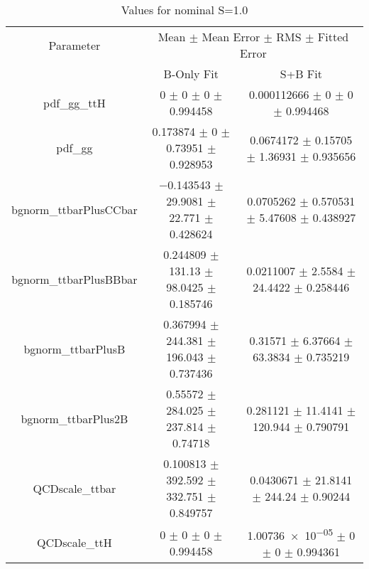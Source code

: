 \begin{table}
\centering
\caption{Values for nominal S=1.0}
\begin{tabular}{ccc}
\toprule
Parameter & \multicolumn{2}{c}{Mean $\pm$ Mean Error $\pm$ RMS $\pm$ Fitted Error}\\
 & B-Only Fit & S+B Fit\\
\midrule
pdf\_gg\_ttH & \num{0} $\pm$ \num{0} $\pm$ \num{0} $\pm$ \num{0.994458} & \num{0.000112666} $\pm$ \num{0} $\pm$ \num{0} $\pm$ \num{0.994468}\\
pdf\_gg & \num{0.173874} $\pm$ \num{0} $\pm$ \num{0.73951} $\pm$ \num{0.928953} & \num{0.0674172} $\pm$ \num{0.15705} $\pm$ \num{1.36931} $\pm$ \num{0.935656}\\
bgnorm\_ttbarPlusCCbar & \num{-0.143543} $\pm$ \num{29.9081} $\pm$ \num{22.771} $\pm$ \num{0.428624} & \num{0.0705262} $\pm$ \num{0.570531} $\pm$ \num{5.47608} $\pm$ \num{0.438927}\\
bgnorm\_ttbarPlusBBbar & \num{0.244809} $\pm$ \num{131.13} $\pm$ \num{98.0425} $\pm$ \num{0.185746} & \num{0.0211007} $\pm$ \num{2.5584} $\pm$ \num{24.4422} $\pm$ \num{0.258446}\\
bgnorm\_ttbarPlusB & \num{0.367994} $\pm$ \num{244.381} $\pm$ \num{196.043} $\pm$ \num{0.737436} & \num{0.31571} $\pm$ \num{6.37664} $\pm$ \num{63.3834} $\pm$ \num{0.735219}\\
bgnorm\_ttbarPlus2B & \num{0.55572} $\pm$ \num{284.025} $\pm$ \num{237.814} $\pm$ \num{0.74718} & \num{0.281121} $\pm$ \num{11.4141} $\pm$ \num{120.944} $\pm$ \num{0.790791}\\
QCDscale\_ttbar & \num{0.100813} $\pm$ \num{392.592} $\pm$ \num{332.751} $\pm$ \num{0.849757} & \num{0.0430671} $\pm$ \num{21.8141} $\pm$ \num{244.24} $\pm$ \num{0.90244}\\
QCDscale\_ttH & \num{0} $\pm$ \num{0} $\pm$ \num{0} $\pm$ \num{0.994458} & \num{1.00736e-05} $\pm$ \num{0} $\pm$ \num{0} $\pm$ \num{0.994361}\\
\bottomrule
\end{tabular}
\end{table}